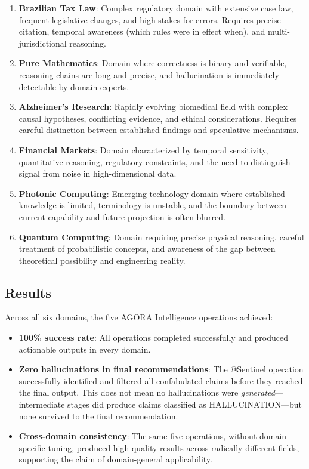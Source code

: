 \documentclass[11pt,a4paper]{article}
\begin{document}
\begin{enumerate}
    \item \textbf{Brazilian Tax Law}: Complex regulatory domain with extensive case law, frequent legislative changes, and high stakes for errors. Requires precise citation, temporal awareness (which rules were in effect when), and multi-jurisdictional reasoning.

    \item \textbf{Pure Mathematics}: Domain where correctness is binary and verifiable, reasoning chains are long and precise, and hallucination is immediately detectable by domain experts.

    \item \textbf{Alzheimer's Research}: Rapidly evolving biomedical field with complex causal hypotheses, conflicting evidence, and ethical considerations. Requires careful distinction between established findings and speculative mechanisms.

    \item \textbf{Financial Markets}: Domain characterized by temporal sensitivity, quantitative reasoning, regulatory constraints, and the need to distinguish signal from noise in high-dimensional data.

    \item \textbf{Photonic Computing}: Emerging technology domain where established knowledge is limited, terminology is unstable, and the boundary between current capability and future projection is often blurred.

    \item \textbf{Quantum Computing}: Domain requiring precise physical reasoning, careful treatment of probabilistic concepts, and awareness of the gap between theoretical possibility and engineering reality.
\end{enumerate}

\subsection{Results}

Across all six domains, the five AGORA Intelligence operations achieved:

\begin{itemize}
    \item \textbf{100\% success rate}: All operations completed successfully and produced actionable outputs in every domain.
    \item \textbf{Zero hallucinations in final recommendations}: The @Sentinel operation successfully identified and filtered all confabulated claims before they reached the final output. This does not mean no hallucinations were \emph{generated}---intermediate stages did produce claims classified as HALLUCINATION---but none survived to the final recommendation.
    \item \textbf{Cross-domain consistency}: The same five operations, without domain-specific tuning, produced high-quality results across radically different fields, supporting the claim of domain-general applicability.
\end{itemize}
\end{document}
